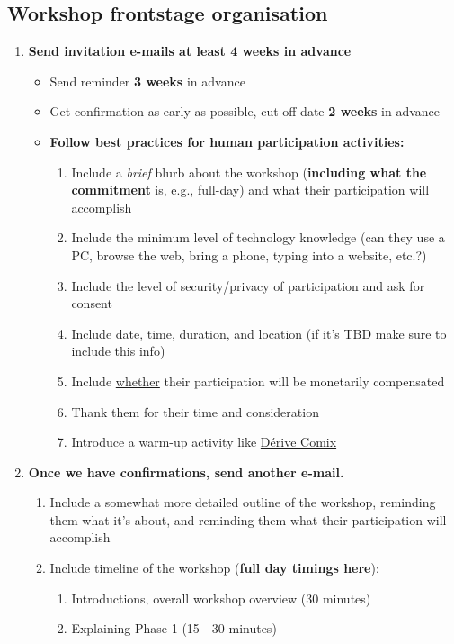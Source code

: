 \documentclass{article}
\begin{document}
\subsection{Workshop frontstage organisation}
\label{2a01f142-31c7-4e86-ae10-e14e85b4dda9}
\begin{enumerate}
\item \textbf{Send invitation e-mails at least 4 weeks in advance}
\begin{itemize}
\item Send reminder \textbf{3 weeks} in advance
\item Get confirmation as early as possible, cut-off date \textbf{2 weeks} in advance
\item \textbf{Follow best practices for human participation activities:}
\begin{enumerate}
\item Include a \emph{brief} blurb about the workshop (\textbf{including what the commitment} is, e.g., full-day) and what their participation will accomplish
\item Include the minimum level of technology knowledge (can they use a PC, browse the web, bring a phone, typing into a website, etc.?)
\item Include the level of security/privacy of participation and ask for consent
\item Include date, time, duration, and location (if it's TBD make sure to include this info)
\item Include \uline{whether} their participation will be monetarily compensated
\item Thank them for their time and consideration
\item Introduce a warm-up activity like \hyperref[615846a2-1795-40b4-8dfb-3e12923fccc0]{Dérive Comix}
\end{enumerate}
\end{itemize}
\item \textbf{Once we have confirmations, send another e-mail.}
\begin{enumerate}
\item Include a somewhat more detailed outline of the workshop, reminding them what it’s about, and reminding them what their participation will accomplish
\item Include timeline of the workshop (\textbf{full day timings here}):
\begin{enumerate}
\item Introductions, overall workshop overview (30 minutes)
\item Explaining Phase 1 (15 - 30 minutes)

\end{enumerate}
\end{enumerate}
\end{enumerate}
\end{document}
